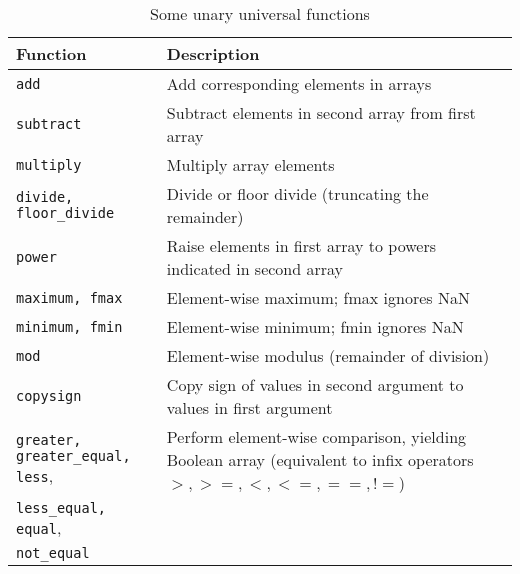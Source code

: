 \begin{table}
    \caption{Some unary universal functions}
    \label{Some binary universal functions}
    \begin{tabularx}{\textwidth}{lX}
        \hline
        Function                    & Description                                                                                                   \\
        \hline
        \verb|add|                  & Add corresponding elements in arrays                                                                          \\
        \verb|subtract|             & Subtract elements in second array from first array                                                            \\
        \verb|multiply|             & Multiply array elements                                                                                       \\
        \verb|divide, floor_divide| & Divide or floor divide (truncating the remainder)                                                             \\
        \verb|power|                & Raise elements in first array to powers indicated in second array                                             \\
        \verb|maximum, fmax|        & Element-wise maximum; fmax ignores NaN                                                                        \\
        \verb|minimum, fmin|        & Element-wise minimum; fmin ignores NaN                                                                        \\
        \verb|mod|                  & Element-wise modulus (remainder of division)                                                                  \\
        \verb|copysign|             & Copy sign of values in second argument to values in first argument                                            \\
        \verb|greater, greater_equal, less|,             & Perform element-wise comparison, yielding Boolean array (equivalent to infix operators$>, >=, <, <=, ==, !=$) \\
        \verb|less_equal, equal|,   &                                                                                                               \\
        \verb|not_equal|            &                                                                                                               \\

\end{tabularx}
\end{table}
